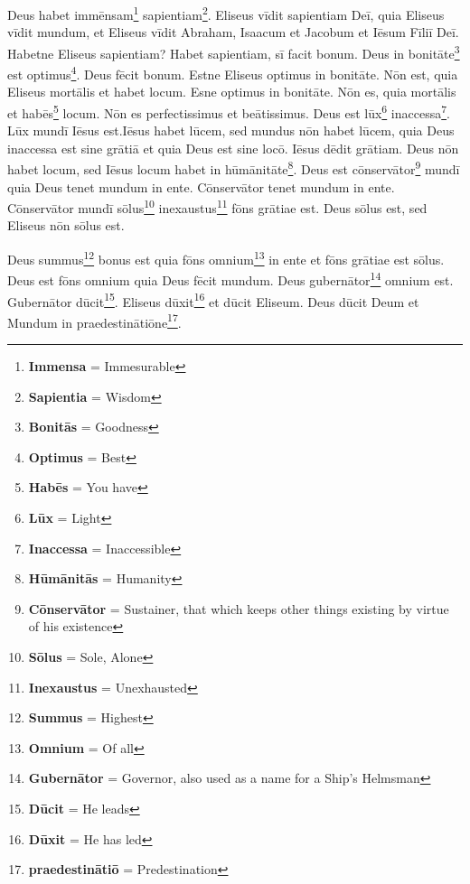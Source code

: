 Deus habet immēnsam\footnote{\textbf{Immensa} = Immesurable} sapientiam\footnote{\textbf{Sapientia} = Wisdom}. Eliseus vīdit sapientiam Deī, quia Eliseus vīdit mundum, et Eliseus vīdit Abraham, Isaacum et Jacobum et Iēsum Fīliī Deī. Habetne Eliseus sapientiam? Habet sapientiam, sī facit bonum. Deus in bonitāte\footnote{\textbf{Bonitās} = Goodness} est optimus\footnote{\textbf{Optimus} = Best}. Deus fēcit bonum.  Estne Eliseus optimus in bonitāte. Nōn est, quia Eliseus mortālis et habet locum. Esne optimus in bonitāte. Nōn es, quia mortālis et habēs\footnote{\textbf{Habēs} = You have} locum. Nōn es perfectissimus et beātissimus. Deus est lūx\footnote{\textbf{Lūx} = Light} inaccessa\footnote{\textbf{Inaccessa} = Inaccessible}. Lūx mundī Iēsus est.Iēsus habet lūcem, sed mundus nōn habet lūcem, quia Deus inaccessa est sine grātiā et quia Deus est sine locō. Iēsus dēdit grātiam. Deus nōn habet locum, sed Iēsus locum habet in hūmānitāte\footnote{\textbf{Hūmānitās} = Humanity}. Deus est cōnservātor\footnote{\textbf{Cōnservātor} = Sustainer, that which keeps other things existing by virtue of his existence} mundī quia Deus tenet mundum in ente. Cōnservātor tenet mundum in ente. Cōnservātor mundī sōlus\footnote{\textbf{Sōlus} = Sole, Alone} inexaustus\footnote{\textbf{Inexaustus} = Unexhausted} fōns grātiae est. Deus sōlus est, sed Eliseus nōn sōlus est. 
\par
Deus summus\footnote{\textbf{Summus} = Highest} bonus est quia fōns omnium\footnote{\textbf{Omnium} = Of all} in ente et fōns grātiae est sōlus. Deus est fōns omnium quia Deus fēcit mundum. Deus gubernātor\footnote{\textbf{Gubernātor} = Governor, also used as a name for a Ship's Helmsman} omnium est. Gubernātor dūcit\footnote{\textbf{Dūcit} = He leads}. Eliseus dūxit\footnote{\textbf{Dūxit} = He has led} et dūcit Eliseum. Deus dūcit Deum et Mundum in praedestinātiōne\footnote{\textbf{praedestinātiō} = Predestination}.  